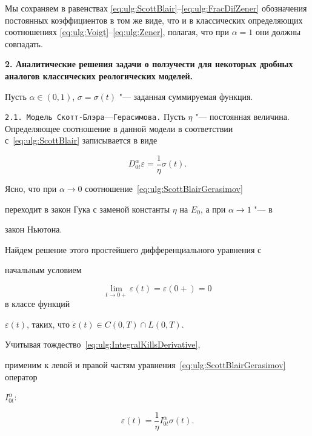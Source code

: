 Мы сохраняем в равенствах \eqref{eq:ulg:ScottBlair}--\eqref{eq:ulg:FracDifZener} обозначения постоянных коэффициентов в том же виде, что и в классических определяющих соотношениях \eqref{eq:ulg:Voigt}--\eqref{eq:ulg:Zener},  полагая, что при $\alpha=1$ они должны совпадать.



\bigskip





{\bf 2. Аналитические решения задачи о ползучести для некоторых дробных аналогов классических реологических моделей.}

 Пусть $\alpha\in(0, 1)$, $\sigma=\sigma(t)$ "---  заданная суммируемая функция.

 

 \smallskip

 

{\tt 2.1. Модель Скотт-Блэра}---{\tt Герасимова.} Пусть $\eta$ "--- постоянная величина. Определяющее соотношение в данной модели в соответствии с~\eqref{eq:ulg:ScottBlair}  записывается в виде

\begin{equation}\label{eq:ulg:ScottBlairGerasimov}

D_{0t}^{\alpha}\varepsilon=\frac{1}{\eta}\sigma(t).

\end{equation}



Ясно, что при $\alpha\rightarrow 0$ соотношение~\eqref{eq:ulg:ScottBlairGerasimov}

переходит в закон Гука с заменой константы $\eta$ на $E_{0}$, а при $\alpha\rightarrow 1$ "--- в

закон Ньютона.



Найдем решение этого простейшего дифференциального уравнения с

начальным условием 

$$\lim_{t\rightarrow

0+}\varepsilon(t)=\varepsilon(0+)=0$$ в классе функций

$\varepsilon(t)$, таких, что $\dot{\varepsilon}(t)\in C(0,T)\cap L(0,T)$.

Учитывая тождество~\eqref{eq:ulg:IntegralKillsDerivative}, 

применим к левой и правой частям уравнения~\eqref{eq:ulg:ScottBlairGerasimov} оператор

$I_{0t}^{\alpha}$:

\begin{equation}\label{eq:ulg:IntScottBlair}

\varepsilon(t)=\frac{1}{\eta}I_{0t}^{\alpha}\sigma(t).

\end{equation}



